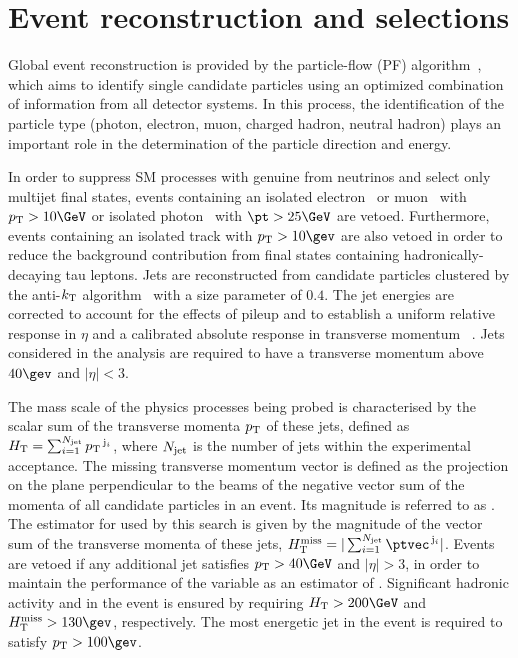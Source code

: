 \section{Event reconstruction and selections} 
\label{sec:event_selection}

Global event reconstruction is provided by the particle-flow (PF)
algorithm~\cite{CMS-PAS-PFT-09-001, CMS-PAS-PFT-10-001}, which aims to
identify single candidate particles using an optimized combination of
information from all detector systems. In this process, the
identification of the particle type (photon, electron, muon, charged
hadron, neutral hadron) plays an important role in the determination
of the particle direction and energy.

In order to suppress SM processes with genuine \ptvecmiss from
neutrinos and select only multijet final states, events containing an
isolated electron~\cite{PAS-EGM-10-004} or muon~\cite{PAS-MUO-10-004}
with $\Pt > 10\GeV$ or isolated photon~\cite{PAS-EGM-10-006} with $\pt
> 25\GeV$ are vetoed. Furthermore, events containing an isolated track
with $\Pt > 10\gev$ are also vetoed in order to reduce the background
contribution from final states containing hadronically-decaying tau
leptons. Jets are reconstructed from candidate particles clustered by
the anti-$k_{\rm T}$ algorithm~\cite{antikt} with a size parameter of
$0.4$. The jet energies are corrected to account for the effects of
pileup and to establish a uniform relative response in $\eta$ and a
calibrated absolute response in transverse momentum
\pt~\cite{cms-jets}. Jets considered in the analysis are required to
have a transverse momentum above $40\gev$ and $|\eta| < 3$.

The mass scale of the physics processes being probed is characterised
by the scalar sum of the transverse momenta ${p_{\text T}}$ of these jets,
defined as $H_{\mathrm{T}} = \sum_{i=1}^{N_{\rm jet}} {p_{\text T}}^{\,\mathrm{j}_i}$,
where $N_{\rm jet}$ is the number of jets within the experimental
acceptance. The missing transverse momentum vector \ptvecmiss is
defined as the projection on the plane perpendicular to the beams of
the negative vector sum of the momenta of all candidate particles in
an event. Its magnitude is referred to as \ETmiss. The estimator for
\ETmiss used by this search is given by the magnitude of the vector
sum of the transverse momenta of these jets, $\mht =
|\sum_{i=1}^{N_\text{jet}} \ptvec^{\,\mathrm{j}_i}|$. Events are
vetoed if any additional jet satisfies $\Pt > 40\GeV$ and $|\eta| >
3$, in order to maintain the performance of the variable \mht as an
estimator of \ETmiss. Significant hadronic activity and \ptvecmiss in
the event is ensured by requiring $\scalht > 200\GeV$ and $\mht >
130\gev$, respectively. The most energetic jet in the event is
required to satisfy $\Pt > 100\gev$.

